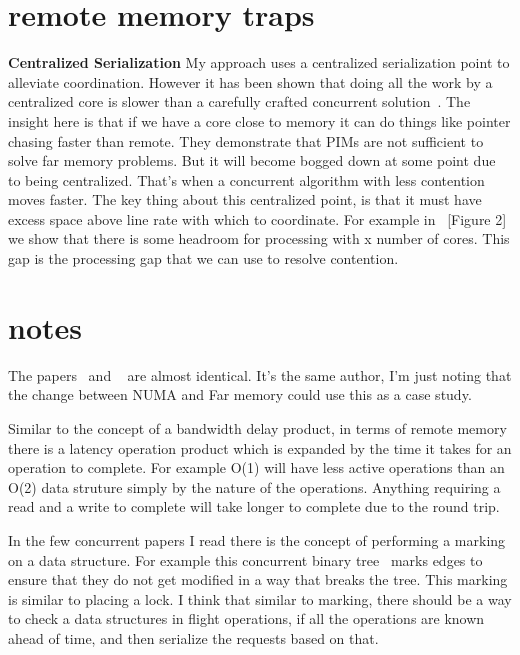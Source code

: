 \section{remote memory traps}

\textbf{Centralized Serialization} My approach uses a centralized serialization
point to alleviate coordination. However it has been shown that doing all the
work by a centralized core is slower than a carefully crafted concurrent
solution~\cite{near-memory-structs}. The insight here is that if we have a core
close to memory it can do things like pointer chasing faster than remote. They
demonstrate that PIMs are not sufficient to solve far memory problems. But it
will become bogged down at some point due to being centralized. That's when a
concurrent algorithm with less contention moves faster. The key thing about this
centralized point, is that it must have excess space above line rate with which
to coordinate. For example in ~\cite{fairnic}[Figure 2] we show that there is
some headroom for processing with x number of cores. This gap is the processing
gap that we can use to resolve contention.

\section{notes}

The papers~\cite{one-side-hash} and ~\cite{write-optimized-hash} are almost
identical. It's the same author, I'm just noting that the change between NUMA
and Far memory could use this as a case study.


Similar to the concept of a bandwidth delay product, in terms of remote memory
there is a latency operation product which is expanded by the time it takes for
an operation to complete. For example O(1) will have less active operations than
an O(2) data struture simply by the nature of the operations. Anything requiring
a read and a write to complete will take longer to complete due to the round
trip.

In the few concurrent papers I read there is the concept of performing a marking
on a data structure. For example this concurrent binary
tree~\cite{fast-concurrent-bin} marks edges to ensure that they do not get
modified in a way that breaks the tree. This marking is similar to placing a
lock. I think that similar to marking, there should be a way to check a data
structures in flight operations, if all the operations are known ahead of time,
and then serialize the requests based on that.

